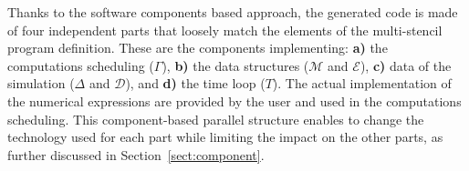 Thanks to the software components based approach, the generated code is made of four independent parts that loosely match the elements of the multi-stencil program definition.
These are the components implementing: \textbf{a)} the computations scheduling ($\Gamma$), \textbf{b)} the data structures ($\mathcal{M}$ and $\mathcal{E}$), \textbf{c)} data of the simulation ($\Delta$ and $\mathcal{D}$), and \textbf{d)} the time loop ($T$). The actual implementation of the numerical expressions are provided by the user and used in the computations scheduling.
This component-based parallel structure enables to change the technology used for each part while limiting the impact on the other parts, as further discussed in Section~\ref{sect:component}.






 

